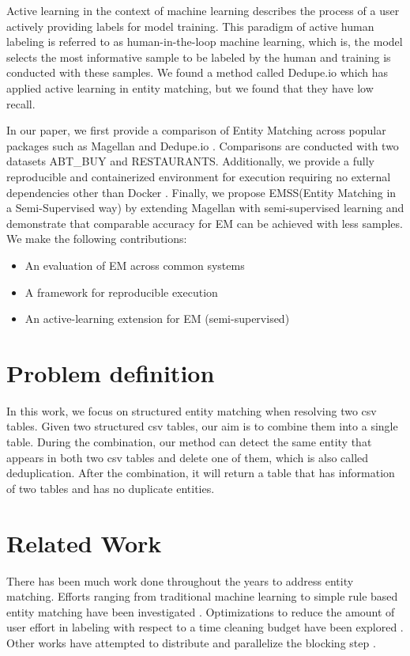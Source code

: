 \documentclass[letterpaper,twocolumn,10pt]{article}
\begin{document}
Active learning in the context of machine learning describes the process of a user actively providing labels for model training. This paradigm of active human labeling is referred to as human-in-the-loop machine learning, which is, the model selects the most informative sample to be labeled by the human and training is conducted with these samples. We found a method called Dedupe.io which has applied active learning in entity matching, but we found that they have low recall. 

In our paper, we first provide a comparison of Entity Matching across popular packages such as Magellan and Dedupe.io \cite{bilenko2004learnable, konda2016magellan}. Comparisons are conducted with two datasets ABT\_BUY and RESTAURANTS. Additionally, we provide a fully reproducible and containerized environment for execution requiring no external dependencies other than Docker \cite{docker:2014}. Finally, we propose EMSS(Entity Matching in a Semi-Supervised way) by extending Magellan with semi-supervised learning and demonstrate that comparable accuracy for EM can be achieved with less samples.
\\

We make the following contributions:
\begin{itemize}
  \item An evaluation of EM across common systems
  \item A framework for reproducible execution
  \item An active-learning extension for EM (semi-supervised)
\end{itemize}

\section{Problem definition}
In this work, we focus on structured entity matching when resolving two csv tables. Given two structured csv tables, our aim is to combine them into a single table. During the combination, our method can detect the same entity that appears in both two csv tables and delete one of them, which is also called deduplication. After the combination, it will return a table that has information of two tables and has no duplicate entities.

\section{Related Work}
There has been much work done throughout the years to address entity matching. Efforts ranging from traditional machine learning to simple rule based entity matching have been investigated \cite{kopcke2010frameworks, fan2014emdr, elmagarmid2007survey}. Optimizations to reduce the amount of user effort in labeling with respect to a time cleaning budget have been explored \cite{ao2019cleaningem}. Other works have attempted to distribute and parallelize the blocking step \cite{chu2016distributed}. 
\end{document}
